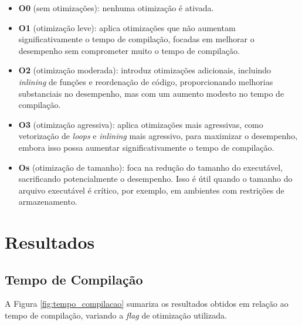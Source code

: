 \documentclass[12pt,a4paper]{article}
\begin{document}
\begin{itemize}
    \item \textbf{O0} (sem otimizações): nenhuma otimização é ativada.
    \item \textbf{O1} (otimização leve): aplica otimizações que não aumentam significativamente o tempo de compilação, focadas em melhorar o desempenho sem comprometer muito o tempo de compilação.
    \item \textbf{O2} (otimização moderada): introduz otimizações adicionais, incluindo \textit{inlining} de funções e reordenação de código, proporcionando melhorias substanciais no desempenho, mas com um aumento modesto no tempo de compilação.
    \item \textbf{O3} (otimização agressiva): aplica otimizações mais agressivas, como vetorização de \textit{loops} e \textit{inlining} mais agressivo, para maximizar o desempenho, embora isso possa aumentar significativamente o tempo de compilação.
    \item \textbf{Os} (otimização de tamanho): foca na redução do tamanho do executável, sacrificando potencialmente o desempenho. Isso é útil quando o tamanho do arquivo executável é crítico, por exemplo, em ambientes com restrições de armazenamento.
\end{itemize}

\section{Resultados}

\subsection{Tempo de Compilação} \label{sec:tempo_compilacao}

A Figura \ref{fig:tempo_compilacao} sumariza os resultados obtidos em relação ao tempo de compilação, variando a \textit{flag} de otimização utilizada.
\end{document}
